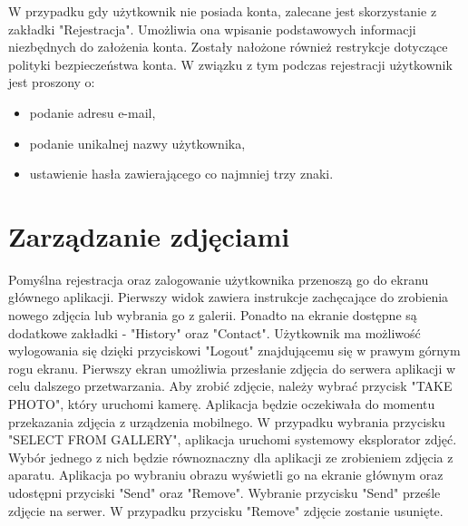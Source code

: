 {W przypadku gdy użytkownik nie posiada konta, zalecane jest skorzystanie z zakładki "Rejestracja". Umożliwia ona wpisanie podstawowych informacji niezbędnych do założenia konta. Zostały nałożone również restrykcje dotyczące polityki bezpieczeństwa konta. W związku z tym podczas rejestracji użytkownik jest proszony o:
\begin{itemize}[noitemsep]
	\item podanie adresu e-mail,
	\item podanie unikalnej nazwy użytkownika,
	\item ustawienie hasła zawierającego co najmniej trzy znaki.
\end{itemize} 
}
\newpage
\section{Zarządzanie zdjęciami}{

Pomyślna rejestracja oraz zalogowanie użytkownika przenoszą go do ekranu głównego aplikacji. Pierwszy widok zawiera instrukcje zachęcające do zrobienia nowego zdjęcia lub wybrania go z galerii. Ponadto na ekranie dostępne są dodatkowe zakładki - "History" oraz "Contact". Użytkownik ma możliwość wylogowania się dzięki przyciskowi "Logout" znajdującemu się w prawym górnym rogu ekranu. Pierwszy ekran umożliwia przesłanie zdjęcia do serwera aplikacji w celu dalszego przetwarzania. Aby zrobić zdjęcie, należy wybrać przycisk "TAKE PHOTO", który uruchomi kamerę. Aplikacja będzie oczekiwała do momentu przekazania zdjęcia z urządzenia mobilnego. W przypadku wybrania przycisku "SELECT FROM GALLERY", aplikacja uruchomi systemowy eksplorator zdjęć. Wybór jednego z nich będzie równoznaczny dla aplikacji ze zrobieniem zdjęcia z aparatu. Aplikacja po wybraniu obrazu wyświetli go na ekranie głównym oraz udostępni przyciski "Send" oraz "Remove". Wybranie przycisku "Send" prześle zdjęcie na serwer. W przypadku przycisku "Remove" zdjęcie zostanie usunięte.

}
